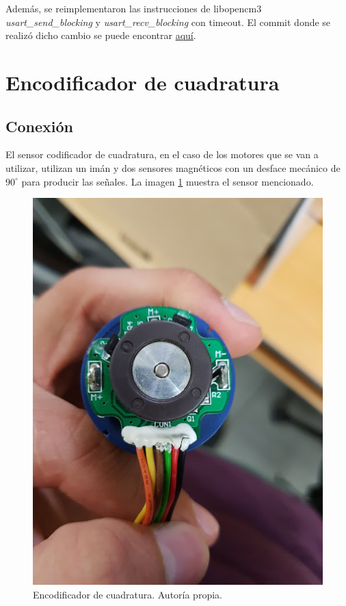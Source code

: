 Además, se reimplementaron las instrucciones de libopencm3 \textit{usart\_send\_blocking} y \textit{usart\_recv\_blocking} con timeout. El commit donde se realizó dicho cambio se puede encontrar \href{https://github.com/arcoslab/stm32-roboclaw/commit/de483b19c8b88b6c0c21cd51b446042f611a888b#diff-ceb3425682487491df75810266c27b6d}{aquí}.

\section{Encodificador de cuadratura}

\subsection{Conexión}

El sensor codificador de cuadratura, en el caso de los motores que se van a utilizar, utilizan un imán y dos sensores magnéticos con un desface mecánico de $90^\circ$ para producir las señales. La imagen \ref{F:encoderfisico} muestra el sensor mencionado.

\begin{figure}[h!]
\centering
\includegraphics[scale=0.5]{imagenes/encoder.jpg}
\caption{Encodificador de cuadratura. Autoría propia.}
\label{F:encoderfisico}
\end{figure}

